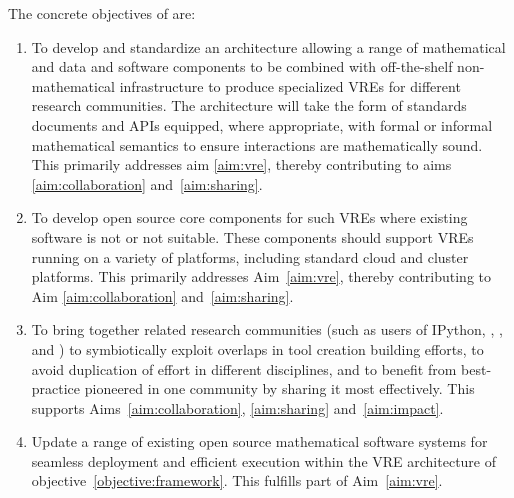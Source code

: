 \documentclass[noworkareas,deliverables,keys]{euproposal}                  %
\begin{document}
\begin{proposal}
The concrete objectives of \TheProject are:
\begin{enumerate}
\item\label{objective:framework} To develop and standardize
  an architecture allowing a range of mathematical and
  data and software components to be combined 
  with off-the-shelf non-mathematical infrastructure to produce
  specialized VREs for different research communities. The
  architecture will take the form of standards documents and APIs
  equipped, where appropriate, with formal or informal mathematical
  semantics to ensure interactions are mathematically sound. This primarily
  addresses aim \ref{aim:vre}, thereby contributing to aims
  \ref{aim:collaboration} and~\ref{aim:sharing}. 

\item\label{objectives:core} To develop open source core components
  for such VREs where existing software is not  or not suitable. These
  components should support VREs running on a variety of
  platforms, including standard cloud and cluster platforms. This primarily
  addresses Aim~\ref{aim:vre}, thereby contributing to Aim
  \ref{aim:collaboration} and~\ref{aim:sharing}.


\item \label{objective:community} To bring together related research
  communities (such as users of IPython, \Sage, \Singular, and \GAP)
  to symbiotically exploit overlaps in tool creation building efforts,
  to avoid duplication of effort in different disciplines, and to
  benefit from best-practice pioneered in one community by sharing it
  most effectively. This supports Aims~\ref{aim:collaboration},
  \ref{aim:sharing} and~\ref{aim:impact}.


\item \label{objective:updates} Update a range of existing open source
  mathematical software systems for seamless deployment and efficient
  execution within the VRE architecture of objective~\ref{objective:framework}.
  This fulfills part of Aim~\ref{aim:vre}.




\end{enumerate}
\end{proposal}
\end{document}
